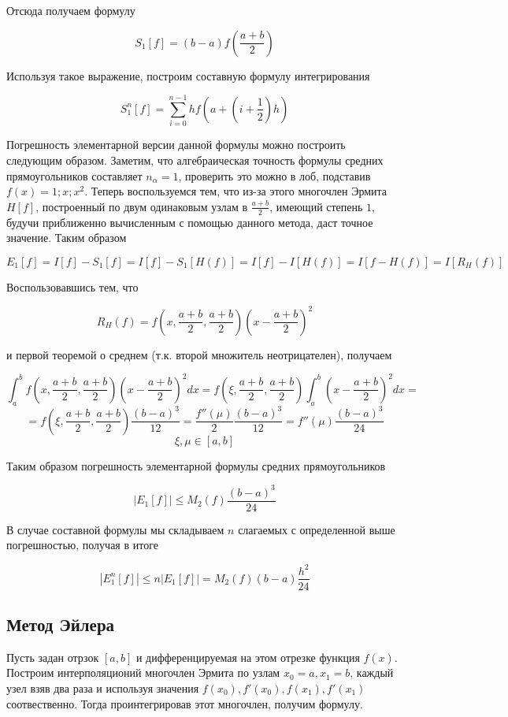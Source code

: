\documentclass[11pt,a4paper,oneside]{article}
\begin{document}
Отсюда получаем формулу

$$ S_1[f] = (b - a) f \left( \frac{a + b}{2} \right) $$

Используя такое выражение, построим составную формулу интегрирования

$$ S_1^n[f] = \sum_{i = 0}^{n - 1} h f \left( a + \left( i + \frac{1}{2} \right) h \right) $$

Погрешность элементарной версии данной формулы можно построить следующим образом. Заметим, что алгебраическая точность формулы средних прямоугольников составляет $n_{\alpha} = 1$, проверить это можно в лоб, подставив $f(x) = 1; x; x^2$. Теперь воспользуемся тем, что из-за этого многочлен Эрмита $H[f]$, построенный по двум одинаковым узлам в $\frac{a + b}{2}$, имеющий степень $1$, будучи приближенно вычисленным с помощью данного метода, даст точное значение. Таким образом

$$ E_1[f] = I[f] - S_1[f] = I[f] - S_1[H(f)] = I[f] - I[H(f)] = I[f - H(f)] = I[R_H(f)] $$

Воспользовавшись тем, что

$$ R_H(f) = f \left( x, \frac{a + b}{2}, \frac{a + b}{2} \right) \left( x - \frac{a + b}{2} \right)^2 $$

и первой теоремой о среднем (т.к. второй множитель неотрицателен), получаем

$$ \int_{a}^{b} f \left( x, \frac{a + b}{2}, \frac{a + b}{2} \right) \left( x - \frac{a + b}{2} \right)^2 dx
	= f \left( \xi, \frac{a + b}{2}, \frac{a + b}{2} \right) \int_{a}^{b} \left( x - \frac{a + b}{2} \right)^2 dx
	=  $$
$$ = f \left( \xi, \frac{a + b}{2}, \frac{a + b}{2} \right) \frac{(b - a)^3}{12}
	= \frac{f''(\mu)}{2} \frac{(b - a)^3}{12} = f''(\mu) \frac{(b - a)^3}{24} $$
$$ \xi, \mu \in [a, b] $$

Таким образом погрешность элементарной формулы средних прямоугольников

$$ \left| E_1[f] \right| \le M_2(f) \frac{(b - a)^3}{24} $$

В случае составной формулы мы складываем $n$ слагаемых с определенной выше погрешностью, получая в итоге

$$ \left| E_1^n[f] \right| \le n \left| E_1[f] \right| = M_2(f) (b - a) \frac{h^2}{24} $$

\subsection{Метод Эйлера}

Пусть задан отрзок $[a, b]$ и дифференцируемая на этом отрезке функция $f(x)$. Построим интерполяционий многочлен Эрмита по узлам $x_0 = a, x_1 = b$, каждый узел взяв два раза и используя значения $f(x_0), f'(x_0), f(x_1), f'(x_1)$ соотвественно. Тогда проинтегрировав этот многочлен, получим формулу.
\end{document}
